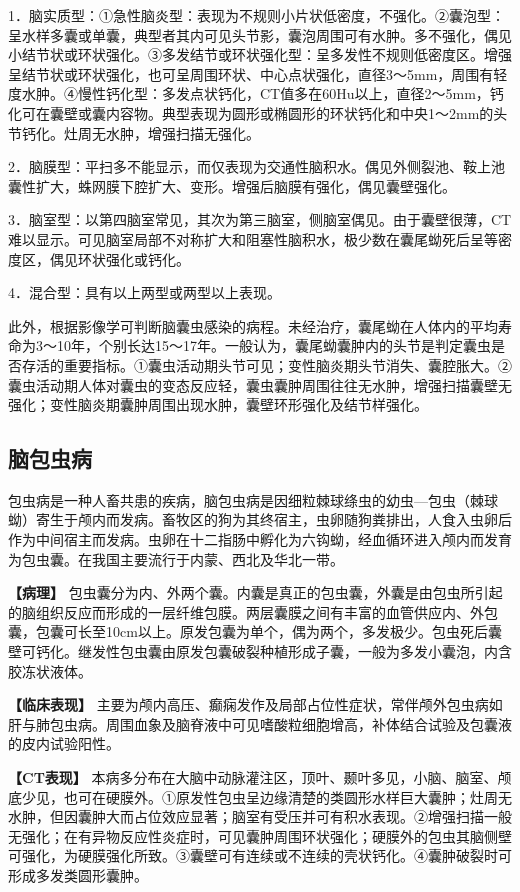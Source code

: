 1．脑实质型：①急性脑炎型：表现为不规则小片状低密度，不强化。②囊泡型：呈水样多囊或单囊，典型者其内可见头节影，囊泡周围可有水肿。多不强化，偶见小结节状或环状强化。③多发结节或环状强化型：呈多发性不规则低密度区。增强呈结节状或环状强化，也可呈周围环状、中心点状强化，直径3～5mm，周围有轻度水肿。④慢性钙化型：多发点状钙化，CT值多在60Hu以上，直径2～5mm，钙化可在囊壁或囊内容物。典型表现为圆形或椭圆形的环状钙化和中央1～2mm的头节钙化。灶周无水肿，增强扫描无强化。

2．脑膜型：平扫多不能显示，而仅表现为交通性脑积水。偶见外侧裂池、鞍上池囊性扩大，蛛网膜下腔扩大、变形。增强后脑膜有强化，偶见囊壁强化。

3．脑室型：以第四脑室常见，其次为第三脑室，侧脑室偶见。由于囊壁很薄，CT难以显示。可见脑室局部不对称扩大和阻塞性脑积水，极少数在囊尾蚴死后呈等密度区，偶见环状强化或钙化。

4．混合型：具有以上两型或两型以上表现。

此外，根据影像学可判断脑囊虫感染的病程。未经治疗，囊尾蚴在人体内的平均寿命为3～10年，个别长达15～17年。一般认为，囊尾蚴囊肿内的头节是判定囊虫是否存活的重要指标。①囊虫活动期头节可见；变性脑炎期头节消失、囊腔胀大。②囊虫活动期人体对囊虫的变态反应轻，囊虫囊肿周围往往无水肿，增强扫描囊壁无强化；变性脑炎期囊肿周围出现水肿，囊壁环形强化及结节样强化。

\subsection{脑包虫病}

包虫病是一种人畜共患的疾病，脑包虫病是因细粒棘球绦虫的幼虫---包虫（棘球蚴）寄生于颅内而发病。畜牧区的狗为其终宿主，虫卵随狗粪排出，人食入虫卵后作为中间宿主而发病。虫卵在十二指肠中孵化为六钩蚴，经血循环进入颅内而发育为包虫囊。在我国主要流行于内蒙、西北及华北一带。

\textbf{【病理】}
包虫囊分为内、外两个囊。内囊是真正的包虫囊，外囊是由包虫所引起的脑组织反应而形成的一层纤维包膜。两层囊膜之间有丰富的血管供应内、外包囊，包囊可长至10cm以上。原发包囊为单个，偶为两个，多发极少。包虫死后囊壁可钙化。继发性包虫囊由原发包囊破裂种植形成子囊，一般为多发小囊泡，内含胶冻状液体。

\textbf{【临床表现】}
主要为颅内高压、癫痫发作及局部占位性症状，常伴颅外包虫病如肝与肺包虫病。周围血象及脑脊液中可见嗜酸粒细胞增高，补体结合试验及包囊液的皮内试验阳性。

\textbf{【CT表现】}
本病多分布在大脑中动脉灌注区，顶叶、颞叶多见，小脑、脑室、颅底少见，也可在硬膜外。①原发性包虫呈边缘清楚的类圆形水样巨大囊肿；灶周无水肿，但因囊肿大而占位效应显著；脑室有受压并可有积水表现。②增强扫描一般无强化；在有异物反应性炎症时，可见囊肿周围环状强化；硬膜外的包虫其脑侧壁可强化，为硬膜强化所致。③囊壁可有连续或不连续的壳状钙化。④囊肿破裂时可形成多发类圆形囊肿。

